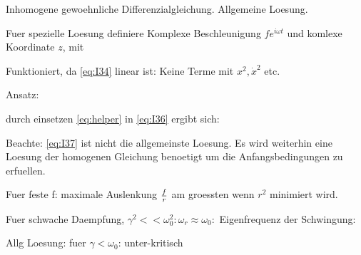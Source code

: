 \documentclass{article}
\begin{document}


Inhomogene gewoehnliche Differenzialgleichung. Allgemeine Loesung.



Fuer spezielle Loesung definiere Komplexe Beschleunigung $f e^{i \omega t}$ und komlexe Koordinate $z$, mit

Funktioniert, da \ref{eq:I34} linear ist: Keine Terme mit $x^2, \dot x^2$ etc.

Ansatz:


durch einsetzen \ref{eq:helper} in \ref{eq:I36} ergibt sich:


Beachte: \ref{eq:I37} ist nicht die allgemeinste Loesung. Es wird weiterhin eine Loesung der homogenen Gleichung benoetigt um die Anfangsbedingungen zu erfuellen.

Fuer feste f: maximale Auslenkung ${f \over r}$ am groessten wenn $r^2$ minimiert wird.



Fuer schwache Daempfung, $\gamma^2 << \omega_0^2: \omega_r \approx \omega_0:$ Eigenfrequenz der Schwingung:

Allg Loesung: fuer $\gamma < \omega_0$: unter-kritisch
\end{document}
